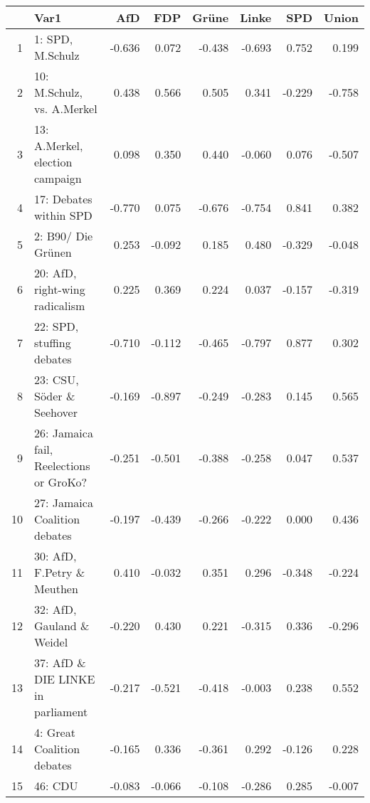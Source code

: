 \begin{table}[ht]
\centering
\begin{adjustbox}{width=\textwidth}
\begin{tabular}{rlrrrrrr}
  \hline
 & Var1 & AfD & FDP & Grüne & Linke & SPD & Union \\ 
  \hline
1 & 1: SPD, M.Schulz & -0.636 & 0.072 & -0.438 & -0.693 & 0.752 & 0.199 \\ 
  2 & 10: M.Schulz, vs. A.Merkel & 0.438 & 0.566 & 0.505 & 0.341 & -0.229 & -0.758 \\ 
  3 & 13: A.Merkel, election campaign & 0.098 & 0.350 & 0.440 & -0.060 & 0.076 & -0.507 \\ 
  4 & 17: Debates within SPD & -0.770 & 0.075 & -0.676 & -0.754 & 0.841 & 0.382 \\ 
  5 & 2: B90/ Die Grünen & 0.253 & -0.092 & 0.185 & 0.480 & -0.329 & -0.048 \\ 
  6 & 20: AfD, right-wing radicalism & 0.225 & 0.369 & 0.224 & 0.037 & -0.157 & -0.319 \\ 
  7 & 22: SPD, stuffing debates & -0.710 & -0.112 & -0.465 & -0.797 & 0.877 & 0.302 \\ 
  8 & 23: CSU, Söder \& Seehover & -0.169 & -0.897 & -0.249 & -0.283 & 0.145 & 0.565 \\ 
  9 & 26: Jamaica fail, Reelections or GroKo? & -0.251 & -0.501 & -0.388 & -0.258 & 0.047 & 0.537 \\ 
  10 & 27: Jamaica Coalition debates & -0.197 & -0.439 & -0.266 & -0.222 & 0.000 & 0.436 \\ 
  11 & 30: AfD, F.Petry \& Meuthen & 0.410 & -0.032 & 0.351 & 0.296 & -0.348 & -0.224 \\ 
  12 & 32: AfD, Gauland \& Weidel & -0.220 & 0.430 & 0.221 & -0.315 & 0.336 & -0.296 \\ 
  13 & 37: AfD \& DIE LINKE in parliament & -0.217 & -0.521 & -0.418 & -0.003 & 0.238 & 0.552 \\ 
  14 & 4: Great Coalition debates & -0.165 & 0.336 & -0.361 & 0.292 & -0.126 & 0.228 \\ 
  15 & 46: CDU & -0.083 & -0.066 & -0.108 & -0.286 & 0.285 & -0.007 \\ 
   \hline
\end{tabular}
\label{t_ccf}
\end{adjustbox}
\end{table}
